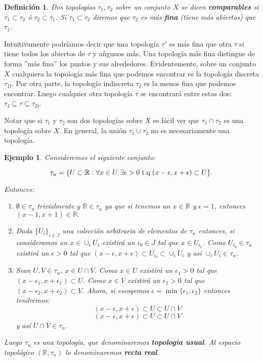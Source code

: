 \documentclass[12pt]{article}
\newtheorem{definition}[theorem]{Definición}
\newtheorem{example}{Ejemplo}[theorem]
\begin{document}
\begin{definition}Dos topologías $\tau_1, \tau_2$ sobre un conjunto $X$ se dicen \textbf{comparables} si $\tau_1 \subset \tau_2$ ó $\tau_2 \subset \tau_1$. Si $\tau_1 \subset \tau_2$ diremos que $\tau_2$ es más \textbf{fina} (tiene más abiertos) que $\tau_1$.
\end{definition}

Intuitivamente podríamos decir que una topología $\tau'$ es más fina que otra $\tau$ si tiene todos los abiertos de $\tau$ y añgunos más. Una topología más fina distingue de forma ''más fina'' los puntos y sus alrededores. Evidentemente, sobre un conjunto $X$ cualquiera la topología más fina que podemos encontrar es la topología discreta $\tau_D$. Por otra parte, la topología indiscreta $\tau_I$ es la menos fina que podemos encontrar. Luego cualquier otra topología $\tau$ se encontrará entre estas dos: $\tau_I \subseteq \tau \subseteq \tau_D$.

Notar que si $\tau_1$ y $\tau_2$ son dos topologías sobre $X$ es fácil ver que $\tau_1 \cap \tau_2$ es una topología sobre $X$. En general, la unión $\tau_1 \cup \tau_2$ no es necesariamente una topología.

\begin{example}\label{eq:topUsual} Consideremos el siguiente conjunto: 

$$\tau_u = \lbrace U \subset \mathbb{R}: \forall x \in U\hspace{0.1cm} \exists \epsilon > 0\hspace{0.1cm} \text{t.q}\hspace{0.1cm} (x-\epsilon, x+ \epsilon) \subset U \rbrace.$$

Entonces: 
\begin{enumerate}
\item $\emptyset \in \tau_u$ trivialmente y $\mathbb{R} \in \tau_u$ ya que si tenemos un $x \in \mathbb{R}$ y $\epsilon = 1$, entonces $(x-1, x+1) \in \mathbb{R}.$
\item Dada $\lbrace U_i \rbrace_{i\in J}$ una colección arbitraria de elementos de $\tau_u$ entonces,  si consideramos un $x \in \cup_i U_i$ existirá un $i_0 \in J$ tal que $x \in U_{i_0}$. Como $U_{i_0} \in \tau_u$ existirá un $\epsilon >0$ tal que $(x-\epsilon, x + \epsilon) \subset U_{i_0} \subset \cup_i U_i$ y así $\cup_i U_i \in \tau_u$.
\item Sean $U, V \in \tau_u$, $x \in U \cap V$. Como $x \in U$ existirá un $\epsilon_1>0$ tal que $(x-\epsilon_1, x+\epsilon_1) \subset U$. Como $x \in V$ existirá un $\epsilon_2 >0$ tal que $(x-\epsilon_2, x+\epsilon_2) \subset V$. Ahora, si escogemos $\epsilon = \min \lbrace \epsilon_1, \epsilon_2 \rbrace$ entonces tendremos: $$(x-\epsilon, x+\epsilon) \subset U \subset U \cap V$$ $$ (x-\epsilon, x+\epsilon) \subset U \subset U \cap V$$ y así $ U \cap V \in \tau_u$.
\end{enumerate}

Luego $\tau_u$ es una topología, que denominaremos \textbf{topología usual}. Al espacio topológico $(\mathbb{R}, \tau_u)$ lo denominaremos \textbf{recta real}.
\end{example}
\end{document}
